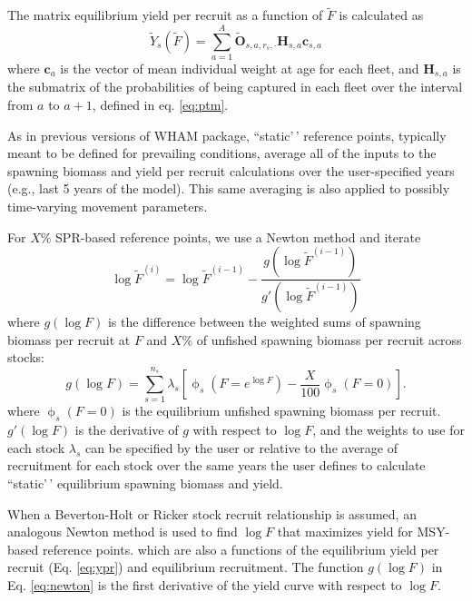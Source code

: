 \documentclass[
]{article}
\begin{document}
The matrix equilibrium yield per recruit as a function of
\(\widetilde F\) is calculated as \begin{equation}\label{eq:ypr}
 \widetilde{Y}_s({\widetilde{F}}) = \sum^{A}_{a=1} \widetilde{\mathbf{O}}_{s,a,r_s,\cdot} \mathbf{H}_{s,a} \mathbf{c}_{s,a}
\end{equation} where \(\mathbf{c}_a\) is the vector of mean individual
weight at age for each fleet, and \(\mathbf{H}_{s,a}\) is the submatrix
of the probabilities of being captured in each fleet over the interval
from \(a\) to \(a+1\), defined in eq. \ref{eq:ptm}.

As in previous versions of WHAM package, ``static'\,' reference points,
typically meant to be defined for prevailing conditions, average all of
the inputs to the spawning biomass and yield per recruit calculations
over the user-specified years (e.g., last 5 years of the model). This
same averaging is also applied to possibly time-varying movement
parameters.

For \(X\%\) SPR-based reference points, we use a Newton method and
iterate \begin{equation}\label{eq:newton}
  \log\widetilde{F}^{(i)} = \log\widetilde{F}^{(i-1)} - \frac{g\left(\log\widetilde{F}^{(i-1)}\right)}{g'\left(\log\widetilde{F}^{(i-1)}\right)}
\end{equation} where \(g(\log F)\) is the difference between the
weighted sums of spawning biomass per recruit at \(F\) and \(X\)\% of
unfished spawning biomass per recruit across stocks:
\begin{equation}\label{eq:newton-obj}
  g(\log F) = \sum^{n_s}_{s=1} \lambda_s\left[\upphi_s\left(F = e^{\log F}\right) - \frac{X}{100}\upphi_s\left(F=0\right)\right].
\end{equation} where \(\upphi_s\left(F=0\right)\) is the equilibrium
unfished spawning biomass per recruit. \(g'(\log F)\) is the derivative
of \(g\) with respect to \(\log F\), and the weights to use for each
stock \(\lambda_s\) can be specified by the user or relative to the
average of recruitment for each stock over the same years the user
defines to calculate ``static'\,' equilibrium spawning biomass and
yield.

When a Beverton-Holt or Ricker stock recruit relationship is assumed, an
analogous Newton method is used to find \(\log F\) that maximizes yield
for MSY-based reference points. which are also a functions of the
equilibrium yield per recruit (Eq. \ref{eq:ypr}) and equilibrium
recruitment. The function \(g(\log F)\) in Eq. \ref{eq:newton} is the
first derivative of the yield curve with respect to \(\log F\).
\end{document}
